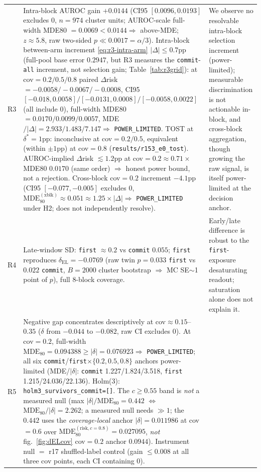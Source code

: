 \documentclass{article}
\begin{document}
\begin{table}[!htbp]
\begin{tabular}{@{}p{}p{}p{}@{}}
    \raggedright R3 & \raggedright Intra-block AUROC gain $+0.0144$ (CI95 $[0.0096,0.0193]$ excludes 0, $n{=}974$ cluster units; AUROC-scale full-width MDE80 $=0.0069<0.0144\Rightarrow$ above-MDE; $z\approx5.8$, raw two-sided $p\ll0.0017=\alpha/3$). Intra-block between-arm increment \eqref{eq:r3-intra-arm} $|\Delta|\le0.7$pp (full-pool base error $0.2947$, but R3 measures the \texttt{commit}-\texttt{all} increment, not selection gain; Table~\ref{tab:r3grid}): at cov$=0.2/0.5/0.8$ paired $\Delta$risk $=-0.0058/-0.0067/-0.0008$, CI95 $[-0.018,0.0058]/[-0.0131,0.0008]/[-0.0058,0.0022]$ (all include $0$), full-width MDE80 $=0.0170/0.0099/0.0057$, MDE$/|\Delta|=2.933/1.483/7.147\Rightarrow$ \texttt{POWER\_LIMITED}. TOST at $\delta^*{=}1$pp: inconclusive at cov$=0.2/0.5$, equivalent (within $\pm1$pp) at cov$=0.8$ (\texttt{results/r153\_e0\_tost}). AUROC-implied $\Delta$risk $\lesssim1.2$pp at cov$=0.2\approx0.71\times$ MDE80 $0.0170$ (same order) $\Rightarrow$ honest power bound, not a rejection. Cross-block cov$=0.2$ increment $-4.1$pp (CI95 $[-0.077,-0.005]$ excludes 0, $\mathrm{MDE}_{80}^{\mathrm{(xblk)}}{\approx}0.051\approx1.25\times|\Delta|\Rightarrow$ \texttt{POWER\_LIMITED} under H2; does not independently resolve). & \raggedright We observe no resolvable intra-block selection increment (power-limited); measurable discrimination is not actionable in-block, and cross-block aggregation, though growing the raw signal, is itself power-limited at the decision anchor.
    \tabularnewline
    \raggedright R4 & \raggedright Late-window SD: \texttt{first} $\approx0.2$ vs \texttt{commit} $0.055$; \texttt{first} reproduces $\delta_{\mathrm{EL}}{=}-0.0769$ (raw twin $p=0.033$ \texttt{first} vs $0.022$ \texttt{commit}, $B=2000$ cluster bootstrap $\Rightarrow$ MC SE$\sim$1 point of $p$), full 8-block coverage. & \raggedright Early/late difference is robust to the \texttt{first}-exposure desaturating readout; saturation alone
    does not explain it. \tabularnewline
    \raggedright R5 & \raggedright Negative gap concentrates descriptively at cov$\approx0.15$--$0.35$ ($\delta$ from $-0.044$ to $-0.082$, raw CI excludes 0). At cov$=0.2$, full-width $\mathrm{MDE}_{80}=0.094388\ge|\delta|=0.076923\Rightarrow$ \texttt{POWER\_LIMITED}; all six \texttt{commit}/\texttt{first}$\times\{0.2,0.5,0.8\}$ anchors power-limited (MDE/$|\delta|$: \texttt{commit} 1.227/1.824/3.518, \texttt{first} 1.215/24.036/22.136). Holm(3): \texttt{holm3\_survivors\_commit=[]}. The $c\ge0.55$ band is \emph{not} a measured null (max $|\delta|/\mathrm{MDE}_{80}=0.442$ $\Leftrightarrow$ $\mathrm{MDE}_{80}/|\delta|=2.262$; a measured null needs $\gg1$; the $0.442$ uses the \emph{coverage-local} anchor $|\delta|{=}0.011986$ at cov$=0.6$ over $\mathrm{MDE}_{80}^{(\mathrm{risk},c{=}0.8)}{=}0.027095$, \emph{not} fig.~\ref{fig:dELcov} cov$=0.2$ anchor $0.0944$). Instrument null $=$ r17 shuffled-label control (gain $\le0.008$ at all three cov points, each CI containing 0). &

\end{tabular}
\end{table}
\end{document}
